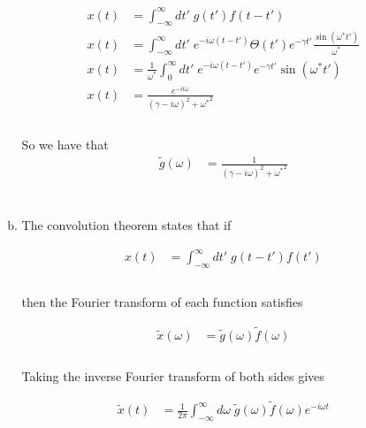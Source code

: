 \documentclass[]{article}
\begin{document}
\begin{enumerate}[1)]
\begin{enumerate}[a)]
\begin{equation}
\begin{aligned}
x(t) & = \int_{-\infty}^{\infty} dt' \;  g(t')   f(t - t')  \\
x(t) & = \int_{-\infty}^{\infty} dt' \;  e^{ - i \omega (t - t') } \Theta(t') e^{  -\gamma t'  } \frac{ \sin(  \omega^* t'  ) }{\omega^*  }  \\
x(t) & = \frac{ 1 }{\omega^*  } \int_{0}^{\infty} dt' \;  e^{ - i \omega (t - t') } e^{  -\gamma t'  } \sin(  \omega^* t'  ) \\
x(t) & = \frac{ e^{ - i t \omega} }{ (\gamma - i \omega )^2 + {\omega^*}^2} \\
\end{aligned}
\end{equation} \\

So we have that \\

\begin{equation}
\begin{aligned}
\tilde{g}(\omega) & = \frac{ 1 }{ (\gamma - i \omega )^2 + {\omega^*}^2} \\
\end{aligned}
\end{equation} \\


\item The convolution theorem states that if

\begin{equation}
\begin{aligned}
 x(t) & = \int_{-\infty}^{\infty} dt' \; g(t - t')   f(t') \\
\end{aligned}
\end{equation} \\

then the Fourier transform of each function satisfies

\begin{equation}
\begin{aligned}
 \tilde{x}(\omega) & =  \tilde{g}( \omega )   \tilde{f}(\omega) \\
\end{aligned}
\end{equation} \\

Taking the inverse Fourier transform of both sides gives

\begin{equation}
\begin{aligned}
 \tilde{x}(t) & =   \frac{1}{2\pi} \int_{-\infty}^{\infty} d\omega \;  \tilde{g}( \omega )  \tilde{f}(\omega)  e^{- i \omega t } \\
\end{aligned}
\end{equation} \\


\end{enumerate}
\end{enumerate}
\end{document}
